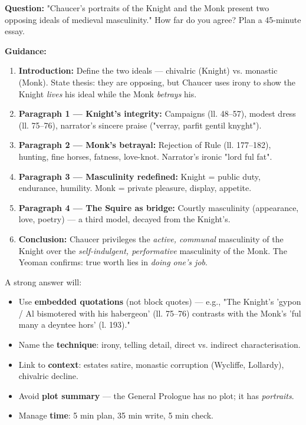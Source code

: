 \documentclass[11pt]{article}
\newcommand{\cle}[1]{{\popxbold\color{popdark}#1}}
\begin{document}
\begin{exercice}
\textbf{Question:} "Chaucer's portraits of the Knight and the Monk present two opposing ideals of medieval masculinity." How far do you agree? Plan a 45-minute essay.

\textbf{Guidance:}
\begin{enumerate}
\item \textbf{Introduction:} Define the two ideals — \cle{chivalric} (Knight) vs. \cle{monastic} (Monk). State thesis: they are opposing, but Chaucer uses irony to show the Knight \emph{lives} his ideal while the Monk \emph{betrays} his.
\item \textbf{Paragraph 1 — Knight's integrity:} Campaigns (ll. 48–57), modest dress (ll. 75–76), narrator's sincere praise ("verray, parfit gentil knyght").
\item \textbf{Paragraph 2 — Monk's betrayal:} Rejection of Rule (ll. 177–182), hunting, fine horses, fatness, love-knot. Narrator's ironic "lord ful fat".
\item \textbf{Paragraph 3 — Masculinity redefined:} Knight = public duty, endurance, humility. Monk = private pleasure, display, appetite.
\item \textbf{Paragraph 4 — The Squire as bridge:} Courtly masculinity (appearance, love, poetry) — a third model, decayed from the Knight's.
\item \textbf{Conclusion:} Chaucer privileges the \emph{active, communal} masculinity of the Knight over the \emph{self-indulgent, performative} masculinity of the Monk. The Yeoman confirms: true worth lies in \emph{doing one's job}.
\end{enumerate}
\end{exercice}

\begin{corrige}
A strong answer will:
\begin{itemize}
\item Use \textbf{embedded quotations} (not block quotes) — e.g., "The Knight's 'gypon / Al bismotered with his habergeon' (ll. 75–76) contrasts with the Monk's 'ful many a deyntee hors' (l. 193)."
\item Name the \textbf{technique}: irony, telling detail, direct vs. indirect characterisation.
\item Link to \textbf{context}: estates satire, monastic corruption (Wycliffe, Lollardy), chivalric decline.
\item Avoid \textbf{plot summary} — the General Prologue has no plot; it has \emph{portraits}.
\item Manage \textbf{time}: 5 min plan, 35 min write, 5 min check.
\end{itemize}
\end{corrige}
\end{document}
